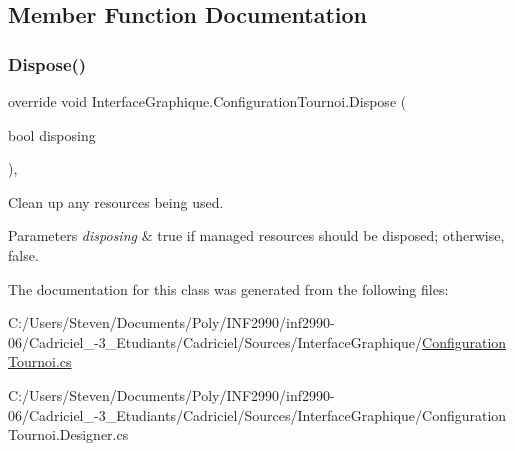 \subsection{Member Function Documentation}
\hypertarget{class_interface_graphique_1_1_configuration_tournoi_ad801e75807538977aa896ae679e403ec}{}\label{class_interface_graphique_1_1_configuration_tournoi_ad801e75807538977aa896ae679e403ec} 
\subsubsection{\texorpdfstring{Dispose()}{Dispose()}}
{\footnotesize\ttfamily override void Interface\+Graphique.\+Configuration\+Tournoi.\+Dispose (\begin{DoxyParamCaption}\item[{bool}]{disposing }\end{DoxyParamCaption})\hspace{0.3cm}{\ttfamily [inline]}, {\ttfamily [protected]}}



Clean up any resources being used. 


\begin{DoxyParams}{Parameters}
{\em disposing} & true if managed resources should be disposed; otherwise, false.\\
\hline
\end{DoxyParams}


The documentation for this class was generated from the following files\+:\begin{DoxyCompactItemize}
\item 
C\+:/\+Users/\+Steven/\+Documents/\+Poly/\+I\+N\+F2990/inf2990-\/06/\+Cadriciel\+\_-\/3\+\_\+\+Etudiants/\+Cadriciel/\+Sources/\+Interface\+Graphique/\hyperlink{_configuration_tournoi_8cs}{Configuration\+Tournoi.\+cs}\item 
C\+:/\+Users/\+Steven/\+Documents/\+Poly/\+I\+N\+F2990/inf2990-\/06/\+Cadriciel\+\_-\/3\+\_\+\+Etudiants/\+Cadriciel/\+Sources/\+Interface\+Graphique/Configuration\+Tournoi.\+Designer.\+cs\end{DoxyCompactItemize}
